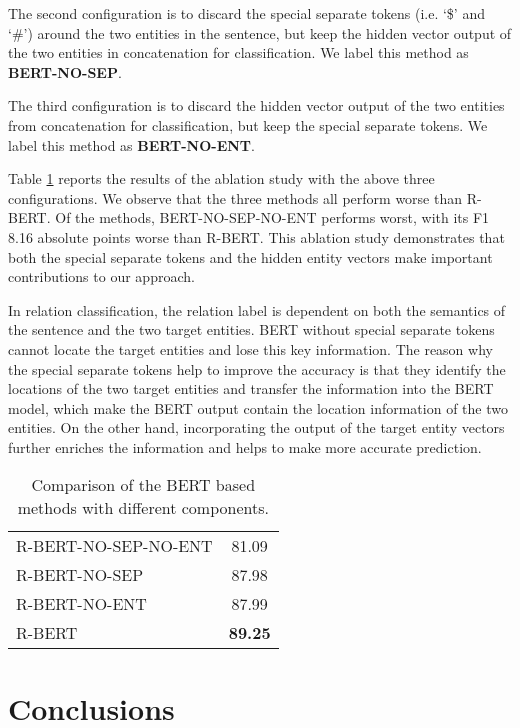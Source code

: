 \documentclass[11pt]{article}
\begin{document}
The second configuration is to discard the special separate tokens (i.e. `\$' and `\#') around
the two entities in the sentence, but keep the hidden vector output
of the two entities in concatenation for classification. We label this method as
\textbf{BERT-NO-SEP}.

The third configuration is to discard the hidden vector output
of the two entities from concatenation for classification, but keep the special separate tokens. We label this method as
\textbf{BERT-NO-ENT}.

Table \ref{tab:component_f1} reports the results of the ablation study
with the above three configurations. We observe that the three
methods all perform worse than R-BERT. Of the methods,  BERT-NO-SEP-NO-ENT performs worst, with its F1 8.16 absolute points worse
than R-BERT. This ablation study demonstrates that both the special separate
tokens and the hidden entity vectors make important contributions
to our approach.

 In relation classification, the relation label is dependent on 
both the semantics of the sentence and the two target entities. BERT without
special separate tokens cannot locate the target entities and lose this key 
information. 
The reason why the special separate tokens help to improve the
accuracy is that they identify the locations of the two target entities and 
transfer the information into the BERT model, which make the BERT output
contain the location information of the two entities. On the other hand,
incorporating the output of the target entity vectors further enriches the information and helps to make more accurate prediction.  
 

\begin{table}[H]
	\caption{Comparison of the BERT based methods with different components.}  
\label{tab:component_f1}
	\begin{tabular}{ | l | c | }
		\hline
		\thead{Method}  & \thead{F1} \\
		\hline
		R-BERT-NO-SEP-NO-ENT  & 81.09  \\	
		\hline
		R-BERT-NO-SEP  & 87.98 \\	
		\hline
		R-BERT-NO-ENT  & 87.99  \\	
		\hline
	    R-BERT  & \textbf{89.25} \\	
		\hline
	\end{tabular}
\end{table}



%
 

\section{Conclusions} \label{twitter_sec:conclude}
\end{document}
